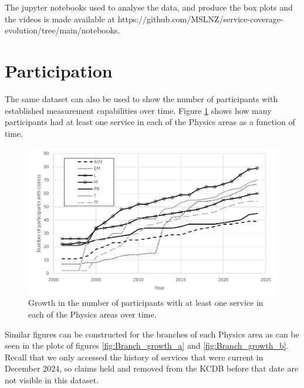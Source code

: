 \documentclass[
	a4paper, %
	10pt, %
	unnumberedsections, %
	twoside, %
]{LTJournalArticle}
\begin{document}
The jupyter notebooks used to analyse the data, and produce the box plots and the videos is made available at https://github.com/MSLNZ/service-coverage-evolution/tree/main/notebooks.

\section{Participation}

The same dataset can also be used to show the number of participants with established measurement capabilities over time. Figure \ref{fig:Physics_growth} shows how many participants had at least one service in each of the Physics areas as a function of time.

\begin{figure}[!htpb]
    \centering
    \includegraphics[width=\linewidth]{figures/Participants_Physics.png}
    \caption{Growth in the number of participants with at least one service in each of the Physics areas over time.}
    \label{fig:Physics_growth}
\end{figure}

Similar figures can be constructed for the branches of each Physics area as can be seen in the plots of figures \ref{fig:Branch_growth_a} and \ref{fig:Branch_growth_b}. Recall that we only accessed the history of services that were current in December 2024, so claims held and removed from the KCDB before that date are not visible in this dataset.
\end{document}
